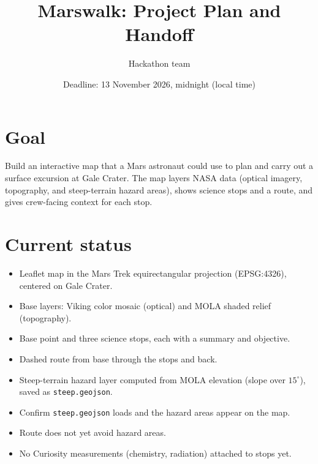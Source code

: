 \documentclass[11pt]{article}
\title{Marswalk: Project Plan and Handoff}
\author{Hackathon team}
\date{Deadline: 13 November 2026, midnight (local time)}
\begin{document}
\maketitle

\section{Goal}
Build an interactive map that a Mars astronaut could use to plan and carry out a surface excursion at Gale Crater. The map layers NASA data (optical imagery, topography, and steep-terrain hazard areas), shows science stops and a route, and gives crew-facing context for each stop.

\section{Current status}
\begin{itemize}[leftmargin=*]
  \item[\textcolor{green!50!black}{[done]}] Leaflet map in the Mars Trek equirectangular projection (EPSG:4326), centered on Gale Crater.
  \item[\textcolor{green!50!black}{[done]}] Base layers: Viking color mosaic (optical) and MOLA shaded relief (topography).
  \item[\textcolor{green!50!black}{[done]}] Base point and three science stops, each with a summary and objective.
  \item[\textcolor{green!50!black}{[done]}] Dashed route from base through the stops and back.
  \item[\textcolor{green!50!black}{[done]}] Steep-terrain hazard layer computed from MOLA elevation (slope over $15^\circ$), saved as \texttt{steep.geojson}.
  \item[\textcolor{orange!80!black}{[todo]}] Confirm \texttt{steep.geojson} loads and the hazard areas appear on the map.
  \item[\textcolor{orange!80!black}{[todo]}] Route does not yet avoid hazard areas.
  \item[\textcolor{orange!80!black}{[todo]}] No Curiosity measurements (chemistry, radiation) attached to stops yet.
\end{itemize}
\end{document}
